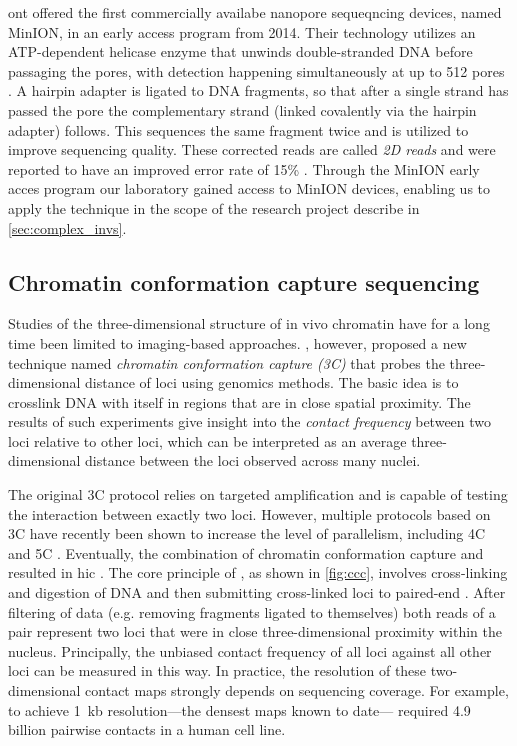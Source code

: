 \Ac{ont} offered the first commercially availabe
nanopore sequeqncing devices, named MinION, in an early access program from 2014.
Their technology utilizes an ATP-dependent helicase enzyme that unwinds double-stranded DNA
before passaging the pores, with detection happening simultaneously at up to
512 pores \citep{Jain2015}. A hairpin adapter is ligated to DNA fragments, so
that after a single strand has passed the pore the complementary strand
(linked covalently via the hairpin adapter) follows. This sequences the same
fragment twice and is utilized to improve sequencing quality. These corrected reads
are called \emph{2D reads} and were reported to have an improved error rate of
15\% \citep{Jain2015}. Through the MinION early acces program our laboratory
gained access to MinION devices, enabling us to apply the technique in the scope
of the research project describe in \cref{sec:complex_invs}.






\subsection{Chromatin conformation capture sequencing}
\label{sec:ccc}

Studies of the three-dimensional structure of in vivo chromatin have for a long
time been limited to imaging-based approaches. \citet{Dekker2002}, however,
proposed a new technique named \emph{chromatin conformation capture (3C)} that
probes the three-dimensional distance of loci using genomics methods. The basic
idea is to crosslink DNA with itself in regions that are in close spatial
proximity. The results of such experiments give insight into the \emph{contact
frequency} between two loci relative to other loci, which can be interpreted as
an average three-dimensional distance between the loci observed across many
nuclei.

The original 3C protocol relies on targeted \pcr amplification and is
capable of testing the interaction between exactly two loci. However, multiple
protocols based on 3C have recently been shown to increase the level of
parallelism, including 4C \citep{Zhao2006,Simonis2006} and 5C \citep{Dostie2006}.
Eventually, the combination of chromatin conformation capture and \mps resulted
in \acf{hic} \citep{Lieberman-Aiden2009}. The core principle of \hic, as shown
in \cref{fig:ccc}, involves cross-linking and digestion of DNA and then
submitting cross-linked loci to paired-end \mps. After filtering of data (e.g.
removing fragments ligated to themselves) both reads of a pair represent two
loci that were in close three-dimensional proximity within the nucleus.
Principally, the unbiased contact frequency of all loci against all other loci
can be measured in this way. In practice, the resolution of these two-dimensional
contact maps strongly depends on sequencing coverage. For example, to achieve
1~kb resolution---the densest maps known to date---\citet{Rao2014} required 4.9
billion pairwise contacts in a human cell line.


